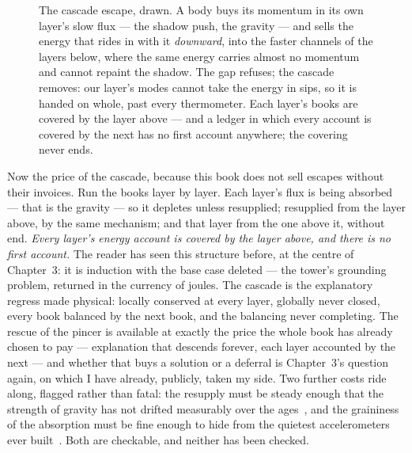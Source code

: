 \documentclass[fontsize=11pt,paper=a4,pagesize=auto,parskip=half-]{scrbook}
\begin{document}
\begin{figure}[htbp]
\caption{The cascade escape, drawn. A body buys its momentum in its own layer's slow flux --- the shadow push, the gravity --- and sells the energy that rides in with it \emph{downward}, into the faster channels of the layers below, where the same energy carries almost no momentum and cannot repaint the shadow. The gap refuses; the cascade removes: our layer's modes cannot take the energy in sips, so it is handed on whole, past every thermometer. Each layer's books are covered by the layer above --- and a ledger in which every account is covered by the next has no first account anywhere; the covering never ends.}
\label{fig:cascade}
\end{figure}

Now the price of the cascade, because this book does not sell escapes without their invoices. Run the books layer by layer. Each layer's flux is being absorbed --- that is the gravity --- so it depletes unless resupplied; resupplied from the layer above, by the same mechanism; and that layer from the one above it, without end. \emph{Every layer's energy account is covered by the layer above, and there is no first account.} The reader has seen this structure before, at the centre of Chapter~3: it is induction with the base case deleted --- the tower's grounding problem, returned in the currency of joules. The cascade is the explanatory regress made physical: locally conserved at every layer, globally never closed, every book balanced by the next book, and the balancing never completing. The rescue of the pincer is available at exactly the price the whole book has already chosen to pay --- explanation that descends forever, each layer accounted by the next --- and whether that buys a solution or a deferral is Chapter~3's question again, on which I have already, publicly, taken my side. Two further costs ride along, flagged rather than fatal: the resupply must be steady enough that the strength of gravity has not drifted measurably over the ages~\cite{hofmann2018}, and the graininess of the absorption must be fine enough to hide from the quietest accelerometers ever built~\cite{armano2018}. Both are checkable, and neither has been checked.
\end{document}
